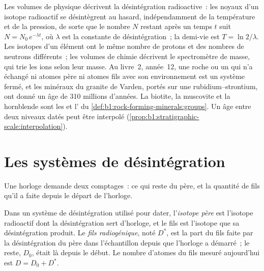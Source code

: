 \begin{recall}
Les volumes de physique décrivent la désintégration radioactive~: les noyaux d'un isotope
radioactif se désintègrent au hasard, indépendamment de la température et de la pression, de sorte que le
nombre $N$ restant après un temps $t$ suit $N = N_0\,e^{-\lambda t}$, où
$\lambda$ est la constante de désintégration~; la demi-vie est $T = \ln 2/\lambda$. Les isotopes
d'un élément ont le même nombre de protons et des nombres de
neutrons différents~; les volumes de chimie décrivent le spectromètre de masse, qui trie les ions
selon leur masse. Au livre~2, année~12, une roche ou un  qui n'a échangé ni atomes père ni
atomes fils avec son environnement est un système fermé, et les minéraux du
granite de Varden, portés sur une  rubidium--strontium, ont donné un âge de 310
millions d'années. La biotite, la muscovite et la hornblende sont les  et l'
du \cref{def:b1:rock-forming-minerals:groups}. Un âge entre deux niveaux datés
peut être interpolé (\cref{prop:b1:stratigraphic-scale:interpolation}).
\end{recall}

\section{Les systèmes de désintégration}\label{sec:b1:radiometric-methods:systems}

Une horloge demande deux comptages~: ce qui reste du père, et la quantité de fils qu'il
a faite depuis le départ de l'horloge.

\begin{definition}\label{def:b1:radiometric-methods:radiogenic}
Dans un système de désintégration utilisé pour dater, l'\emph{isotope père} est l'isotope radioactif dont la désintégration sert d'horloge, et le
fils est l'isotope que sa désintégration produit. Le \emph{fils
radiogénique}, noté $D^*$, est la part du
fils faite par la désintégration du père dans l'échantillon depuis que l'horloge
a démarré~; le reste, $D_0$, était là depuis le début. Le nombre d'atomes du
fils mesuré aujourd'hui est $D = D_0 + D^*$.
\end{definition}

